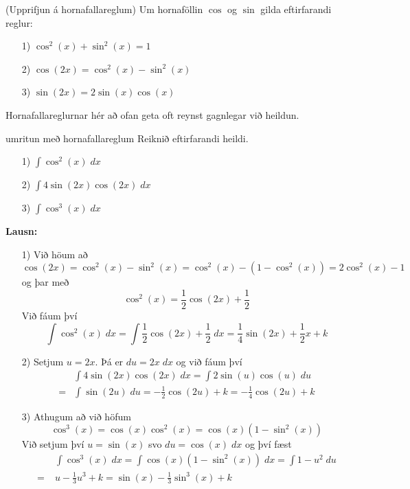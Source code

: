 \begin{regla}{(Upprifjun á hornafallareglum)}
Um hornaföllin $\cos$ og $\sin$ gilda eftirfarandi reglur:
\begin{itemize}
\item[1)] $\displaystyle \cos^{2}(x)+\sin^{2}(x) = 1$

\item[2)] $\displaystyle \cos(2x) = \cos^{2}(x) - \sin^{2}(x)$

\item[3)] $\displaystyle \sin(2x) = 2\sin(x)\cos(x)$
\end{itemize}
\end{regla}

\begin{ath}
Hornafallareglurnar hér að ofan geta oft reynst gagnlegar við heildun.
\end{ath}


\begin{syn}{umritun með hornafallareglum}
Reiknið eftirfarandi heildi.

\begin{itemize}
\item[1)] $\displaystyle \int \cos^{2}(x) \; dx$

\item[2)] $\displaystyle \int 4\sin(2x)\cos(2x) \; dx$

\item[3)] $\displaystyle \int \cos^{3}(x) \; dx$
\end{itemize}

\vspace{2mm}

{\bf Lausn:}

\begin{itemize}
\item[1)] Við höum að
$$
\cos(2x) = \cos^{2}(x)-\sin^{2}(x) = \cos^{2}(x) - (1-\cos^{2}(x)) = 2\cos^{2}(x)-1
$$
og þar með
$$
\cos^{2}(x) = \frac{1}{2}\cos(2x)+\frac{1}{2}
$$
Við fáum því
$$
\int \cos^{2}(x) \; dx = \int \frac{1}{2}\cos(2x)+\frac{1}{2} \; dx = \frac{1}{4}\sin(2x)+\frac{1}{2}x + k
$$

\item[2)] Setjum $u = 2x$. Þá er $du = 2x \; dx$ og við fáum því
\setlength{\jot}{4mm}
\begin{align*}
&\int 4\sin(2x)\cos(2x) \; dx = \int 2\sin(u)\cos(u) \; du \\= &\int \sin(2u) \; du = -\frac{1}{2}\cos(2u) + k = -\frac{1}{4}\cos(2u) + k
\end{align*}

\item[3)] Athugum að við höfum
$$
\cos^{3}(x) = \cos(x)\cos^{2}(x) = \cos(x)\left(1-\sin^{2}(x)\right)
$$
Við setjum því $u = \sin(x)$ svo $du = \cos(x) \; dx$ og því fæst
\begin{align*}
&\int \cos^{3}(x) \; dx = \int \cos(x)\left(1-\sin^{2}(x)\right) \; dx = \int 1 - u^{2} \; du \\= \; &u - \frac{1}{3}u^{3} + k = \sin(x) - \frac{1}{3}\sin^{3}(x) + k
\end{align*}
\end{itemize}

\end{syn}

